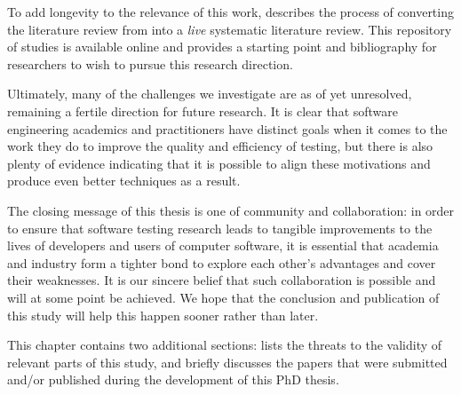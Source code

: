 To add longevity to the relevance of this work,  describes the process of converting the literature review from  into a \textit{live} systematic literature review.
This repository of studies is available online and provides a starting point and bibliography for researchers to wish to pursue this research direction.

Ultimately, many of the challenges we investigate are as of yet unresolved, remaining a fertile direction for future research.
It is clear that software engineering academics and practitioners have distinct goals when it comes to the work they do to improve the quality and efficiency of testing, but there is also plenty of evidence indicating that it is possible to align these motivations and produce even better techniques as a result.

The closing message of this thesis is one of community and collaboration: in order to ensure that software testing research leads to tangible improvements to the lives of developers and users of computer software, it is essential that academia and industry form a tighter bond to explore each other's advantages and cover their weaknesses.
It is our sincere belief that such collaboration is possible and will at some point be achieved.
We hope that the conclusion and publication of this study will help this happen sooner rather than later.

This chapter contains two additional sections:  lists the threats to the validity of relevant parts of this study, and  briefly discusses the papers that were submitted and/or published during the development of this PhD thesis.



